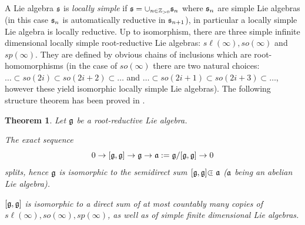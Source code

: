 \documentclass[12pt]{article}
\newcounter{theorem}
\newtheorem{theo}{Theorem}[section]
\newcommand {\ZZ} {\mathbb {Z}}
\def\cplus{\hbox{$\subset${\raise0.3ex\hbox{\kern -0.55em ${\scriptscriptstyle +}$}}\ }}
\begin{document}
A Lie algebra $\frak s$ is {\it locally simple} if $\frak s = \cup_{n\in\ZZ_{>0}}\frak s_n$ where $\frak s_n$ are simple Lie algebras (in this case $\frak s_n$ is automatically reductive in $\frak s_{n+1}$), in particular a locally simple Lie algebra is locally reductive. Up to isomorphism, there are three simple infinite dimensional locally simple root-reductive Lie algebras: $s\ell (\infty), so(\infty)$ and $sp(\infty)$. They are defined by obvious chains of inclusions which are root-homomorphisms (in the case of $so(\infty)$ there are two natural choices: $\ldots\subset so(2i)\subset so(2i+2)\subset\ldots$ and $\ldots\subset so(2i+1)\subset so(2i+3)\subset\ldots$, however these yield isomorphic locally simple Lie algebras).  The following structure theorem has been proved in \cite{DP}.

\begin{theo}
Let $\frak g$ be a root-reductive Lie algebra.

\item[(a)]  The exact sequence
$$
0\to [\frak g,\frak g] \to \frak g \to \frak a := \frak g /[\frak g,\frak g] \to 0
$$
splits, hence $\frak g$ is isomorphic to the semidirect sum $[\frak g,\frak g]\cplus\frak a$ ($\frak a$ being an abelian Lie algebra).

\item[(b)] $[\frak g,\frak g]$ is isomorphic to a direct sum of at most countably many copies of \newline $s\ell (\infty), so(\infty), sp(\infty)$, as well as of simple finite dimensional Lie algebras.
\end{theo}
\end{document}
